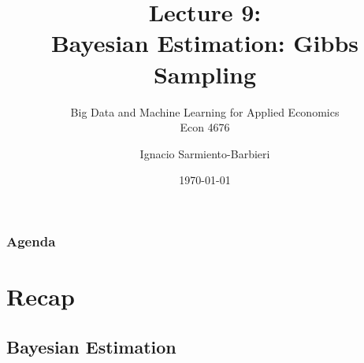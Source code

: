\documentclass[
  shownotes,
  xcolor={svgnames},
  hyperref={colorlinks,citecolor=DarkBlue,linkcolor=DarkRed,urlcolor=DarkBlue}
  , aspectratio=169]{beamer}
\begin{document}
\title[Lecture 9]{Lecture 9: \\  Bayesian Estimation: Gibbs Sampling}
\subtitle{Big Data and Machine Learning for Applied Economics \\ Econ 4676}
\date{\today}

\author[Sarmiento-Barbieri]{Ignacio Sarmiento-Barbieri}


\begin{frame}[noframenumbering]
\maketitle
\end{frame}





\begin{frame}
\frametitle{Agenda}

\tableofcontents


\end{frame}
\section{Recap}
\subsection{Bayesian Estimation}
\end{document}

